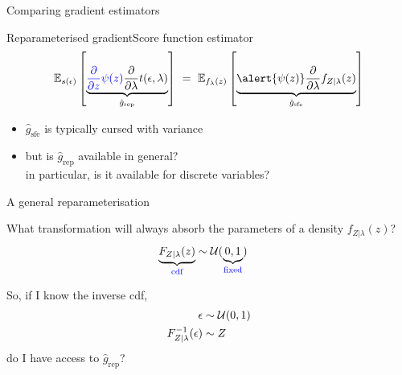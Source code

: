 \begin{frame}{Comparing gradient estimators}

	Reparameterised gradient\hfill Score function estimator
	\begin{equation*}
		\mathbb E_{s(\epsilon)}\left[ \underbrace{\textcolor{blue}{\pdv{z} \psi(z)} \pdv{\lambda} t(\epsilon, \lambda)}_{\hat g_{\text{rep}}} \right]  ~ = ~ \mathbb E_{f_{\lambda}(z)}\left[\underbrace{\alert{\psi(z)} \pdv{\lambda} f_{Z|\lambda}(z)}_{\hat g_{\text{sfe}}} \right]
	\end{equation*}
	
	
	\begin{itemize}

		\item $\hat g_{\text{sfe}}$ is typically cursed with variance
		\item but is $\hat g_{\text{rep}}$ available in general? \\ \pause
		 in particular, is it available for discrete variables?
	\end{itemize}
\end{frame}

\begin{frame}{A general reparameterisation}

	What transformation will always absorb the parameters of a density $f_{Z|\lambda}(z)$? \pause
	\begin{equation*}
		\begin{aligned}
			\underbrace{F_{Z|\lambda}(z)}_{\text{\textcolor{blue}{cdf}}} &\sim \mathcal U(\underbrace{0, 1}_{\text{\textcolor{blue}{fixed}}})			
		\end{aligned}
	\end{equation*}
	
	\pause
	
	So, if I know the inverse cdf, 
	\begin{equation*}
		\begin{aligned}
		\epsilon &\sim \mathcal U(0, 1) \\
		{F}^{-1}_{Z|\lambda}(\epsilon) &\sim Z
		\end{aligned}
	\end{equation*}
	do I have access to $\hat g_{\text{rep}}$?
\end{frame}



